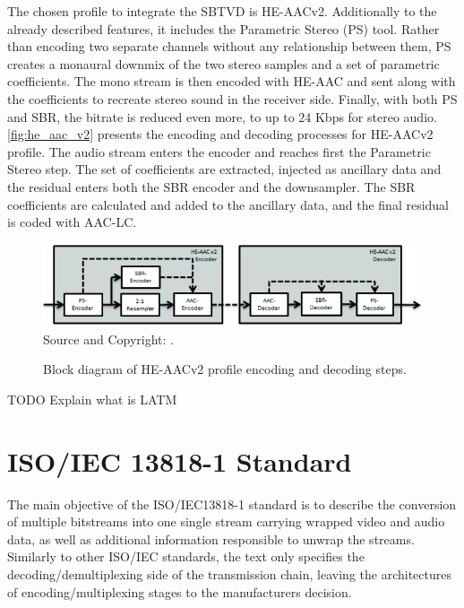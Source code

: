 \documentclass[
	12pt,				%
	openright,			%
	twoside,			%
	a4paper,			%
	brazil,
	french,				%
	english
	]{abntex2}
\begin{document}
The chosen profile to integrate the SBTVD is HE-AACv2. Additionally to the already described features, it includes the Parametric Stereo (PS) tool. Rather than encoding two separate channels without any relationship between them, PS creates a monaural downmix of the two stereo samples and a set of parametric coefficients. The mono stream is then encoded with HE-AAC and sent along with the coefficients to recreate stereo sound in the receiver side. Finally, with both PS and SBR, the bitrate is reduced even more, to up to 24 Kbps for stereo audio. \autoref{fig:he_aac_v2} presents the encoding and decoding processes for HE-AACv2 profile. The audio stream enters the encoder and reaches first the Parametric Stereo step. The set of coefficients are extracted, injected as ancillary data and the residual enters both the SBR encoder and the downsampler. The SBR coefficients are calculated and added to the ancillary data, and the final residual is coded with AAC-LC.

\begin{figure}
\centering
\caption{Block diagram of HE-AACv2 profile encoding and decoding steps.}
\includegraphics[width=1\linewidth]{figuras/he_aac_v2.png}
\\Source and Copyright: \cite{fraunhofer}.
\label{fig:he_aac_v2}
\end{figure}

TODO Explain what is LATM

\chapter{ISO/IEC 13818-1 Standard}
\label{iso13818}
The main objective of the ISO/IEC13818-1 standard is to describe the conversion of multiple bitstreams into one single stream carrying wrapped video and audio data, as well as additional information responsible to unwrap the streams. Similarly to other ISO/IEC standards, the text only specifies the decoding/demultiplexing side of the transmission chain, leaving the architectures of encoding/multiplexing stages to the manufacturers decision.
\end{document}
